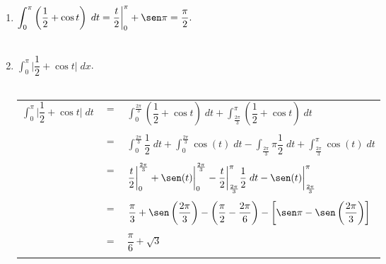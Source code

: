 \begin{enumerate}
\item $\displaystyle\int_0^\pi \left(\dfrac{1}{2}+\cos t\right) \; dt = \dfrac{t}{2}\bigg|_0^\pi+ \sen \pi = \dfrac{\pi}{2}.$\\\\

\item $\displaystyle\int_0^\pi  \bigg|\dfrac{1}{2} + \cos t\bigg|\; dx$.\\\\
    \begin{center}
	\begin{tabular}{rcl}
	    $\displaystyle\int_{0}^{\pi} \bigg| \dfrac{1}{2}+\cos t\bigg| \; dt$&$=$&$\displaystyle\int_0^{\frac{2\pi}{3}}\left(\dfrac{1}{2} + \cos t\right)\; dt + \int_{\frac{2\pi}{3}}^{\pi}\left(\dfrac{1}{2} + \cos t\right)\; dt$\\\\
										&$=$&$\displaystyle\int_0^{\frac{2\pi}{3}} \dfrac{1}{2}\; dt + \int_{0}^{\frac{2\pi}{3}} \cos(t) \; dt - \int_{\frac{2\pi}{3}}\pi \dfrac{1}{2}\; dt + \int_{\frac{2\pi}{3}}^\pi \cos(t) \; dt$\\\\
										&$=$&$\dfrac{t}{2}\bigg|_0^{\frac{2\pi}{3}} + \sen(t)\bigg|_{0}^{\frac{2\pi}{3}} -  \dfrac{t}{2} \bigg|_{\frac{2\pi}{3}}^\pi \dfrac{1}{2}\; dt - \sen(t)\bigg|_{\frac{2\pi}{3}}^\pi$\\\\
										&$=$&$\dfrac{\pi}{3}+\sen\left(\dfrac{2\pi}{3}\right) - \left(\dfrac{\pi}{2}-\dfrac{2\pi}{6}\right)-\left[\sen \pi - \sen\left( \dfrac{2\pi}{3}\right)\right]$\\\\
										&$=$&$\dfrac{\pi}{6}+\sqrt{3}$\\\\
	\end{tabular}
    \end{center}


\end{enumerate}
